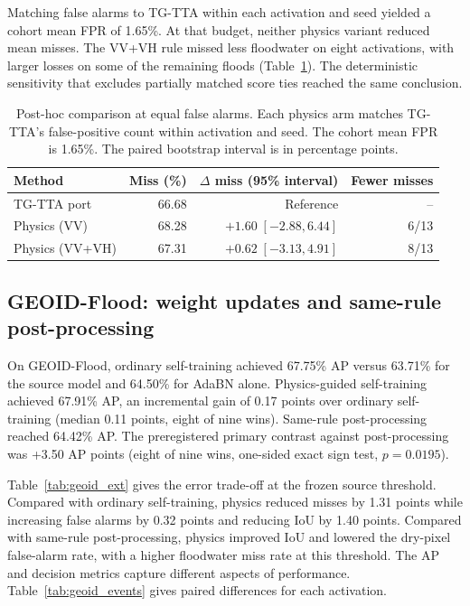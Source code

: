 Matching false alarms to TG-TTA within each activation and seed yielded a cohort mean FPR of 1.65\%. At that budget, neither physics variant reduced mean misses. The VV+VH rule missed less floodwater on eight activations, with larger losses on some of the remaining floods (Table~\ref{tab:tg_matched}). The deterministic sensitivity that excludes partially matched score ties reached the same conclusion.

\begin{table}[pos=t]
\centering
\caption{Post-hoc comparison at equal false alarms. Each physics arm matches TG-TTA's false-positive count within activation and seed. The cohort mean FPR is 1.65\%. The paired bootstrap interval is in percentage points.}
\label{tab:tg_matched}
\begin{tabular}{@{}lrrr@{}}
\toprule
Method & Miss (\%) & $\Delta$ miss (95\% interval) & Fewer misses \\
\midrule
TG-TTA port & 66.68 & Reference & -- \\
Physics (VV) & 68.28 & $+1.60\;[-2.88,6.44]$ & 6/13 \\
Physics (VV+VH) & 67.31 & $+0.62\;[-3.13,4.91]$ & 8/13 \\
\bottomrule
\end{tabular}
\end{table}

\subsection{GEOID-Flood: weight updates and same-rule post-processing}
On GEOID-Flood, ordinary self-training achieved 67.75\% AP versus 63.71\% for the source model and 64.50\% for AdaBN alone. Physics-guided self-training achieved 67.91\% AP, an incremental gain of 0.17 points over ordinary self-training (median 0.11 points, eight of nine wins). Same-rule post-processing reached 64.42\% AP. The preregistered primary contrast against post-processing was +3.50 AP points (eight of nine wins, one-sided exact sign test, $p=0.0195$).

Table~\ref{tab:geoid_ext} gives the error trade-off at the frozen source threshold. Compared with ordinary self-training, physics reduced misses by 1.31 points while increasing false alarms by 0.32 points and reducing IoU by 1.40 points. Compared with same-rule post-processing, physics improved IoU and lowered the dry-pixel false-alarm rate, with a higher floodwater miss rate at this threshold. The AP and decision metrics capture different aspects of performance. Table~\ref{tab:geoid_events} gives paired differences for each activation.

